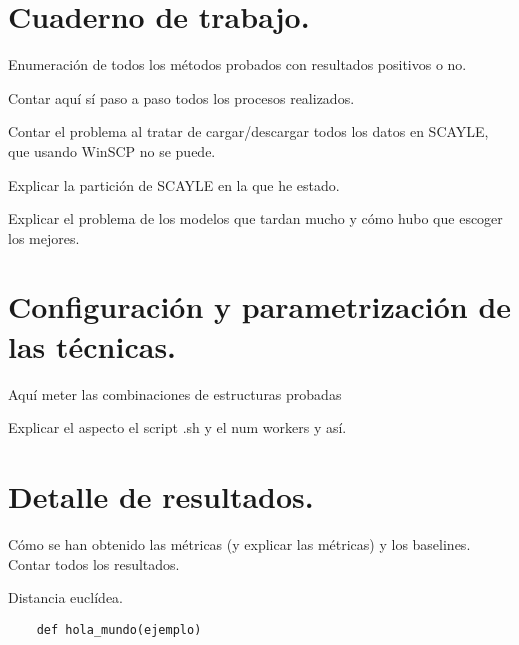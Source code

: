 


\section{Cuaderno de trabajo.}

Enumeración de todos los métodos probados con resultados positivos o no.

Contar aquí sí paso a paso todos los procesos realizados.

Contar el problema al tratar de cargar/descargar todos los datos en SCAYLE, que usando WinSCP no se puede.

Explicar la partición de SCAYLE en la que he estado.

Explicar el problema de los modelos que tardan mucho y cómo hubo que escoger los mejores.


\section{Configuración y parametrización de las técnicas.}

Aquí meter las combinaciones de estructuras probadas

Explicar el aspecto el script .sh y el num workers y así. 

\section{Detalle de resultados.}

Cómo se han obtenido las métricas (y explicar las métricas) y los baselines. Contar todos los resultados.

Distancia euclídea.

\begin{verbatim}
    def hola_mundo(ejemplo)
\end{verbatim}